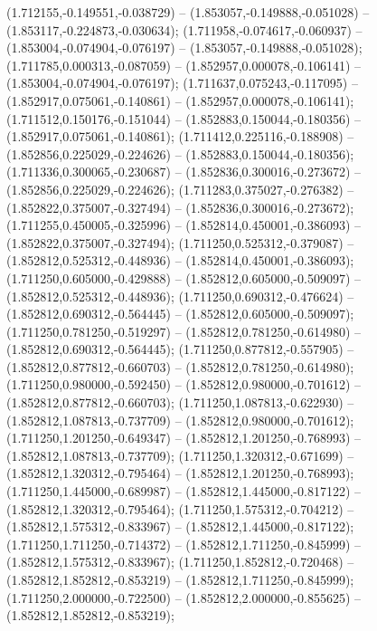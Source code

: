  (1.712155,-0.149551,-0.038729) -- (1.853057,-0.149888,-0.051028) -- (1.853117,-0.224873,-0.030634);
 (1.711958,-0.074617,-0.060937) -- (1.853004,-0.074904,-0.076197) -- (1.853057,-0.149888,-0.051028);
 (1.711785,0.000313,-0.087059) -- (1.852957,0.000078,-0.106141) -- (1.853004,-0.074904,-0.076197);
 (1.711637,0.075243,-0.117095) -- (1.852917,0.075061,-0.140861) -- (1.852957,0.000078,-0.106141);
 (1.711512,0.150176,-0.151044) -- (1.852883,0.150044,-0.180356) -- (1.852917,0.075061,-0.140861);
 (1.711412,0.225116,-0.188908) -- (1.852856,0.225029,-0.224626) -- (1.852883,0.150044,-0.180356);
 (1.711336,0.300065,-0.230687) -- (1.852836,0.300016,-0.273672) -- (1.852856,0.225029,-0.224626);
 (1.711283,0.375027,-0.276382) -- (1.852822,0.375007,-0.327494) -- (1.852836,0.300016,-0.273672);
 (1.711255,0.450005,-0.325996) -- (1.852814,0.450001,-0.386093) -- (1.852822,0.375007,-0.327494);
 (1.711250,0.525312,-0.379087) -- (1.852812,0.525312,-0.448936) -- (1.852814,0.450001,-0.386093);
 (1.711250,0.605000,-0.429888) -- (1.852812,0.605000,-0.509097) -- (1.852812,0.525312,-0.448936);
 (1.711250,0.690312,-0.476624) -- (1.852812,0.690312,-0.564445) -- (1.852812,0.605000,-0.509097);
 (1.711250,0.781250,-0.519297) -- (1.852812,0.781250,-0.614980) -- (1.852812,0.690312,-0.564445);
 (1.711250,0.877812,-0.557905) -- (1.852812,0.877812,-0.660703) -- (1.852812,0.781250,-0.614980);
 (1.711250,0.980000,-0.592450) -- (1.852812,0.980000,-0.701612) -- (1.852812,0.877812,-0.660703);
 (1.711250,1.087813,-0.622930) -- (1.852812,1.087813,-0.737709) -- (1.852812,0.980000,-0.701612);
 (1.711250,1.201250,-0.649347) -- (1.852812,1.201250,-0.768993) -- (1.852812,1.087813,-0.737709);
 (1.711250,1.320312,-0.671699) -- (1.852812,1.320312,-0.795464) -- (1.852812,1.201250,-0.768993);
 (1.711250,1.445000,-0.689987) -- (1.852812,1.445000,-0.817122) -- (1.852812,1.320312,-0.795464);
 (1.711250,1.575312,-0.704212) -- (1.852812,1.575312,-0.833967) -- (1.852812,1.445000,-0.817122);
 (1.711250,1.711250,-0.714372) -- (1.852812,1.711250,-0.845999) -- (1.852812,1.575312,-0.833967);
 (1.711250,1.852812,-0.720468) -- (1.852812,1.852812,-0.853219) -- (1.852812,1.711250,-0.845999);
 (1.711250,2.000000,-0.722500) -- (1.852812,2.000000,-0.855625) -- (1.852812,1.852812,-0.853219);
